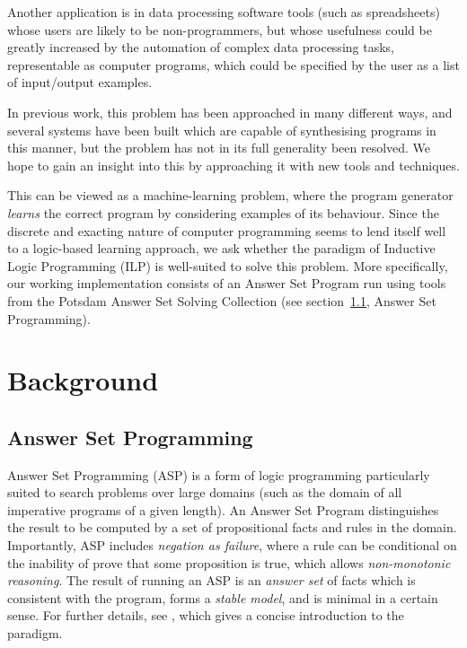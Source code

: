 \documentclass[a4paper,twoside,notitlepage]{article}
\begin{document}
Another application is in data processing software tools (such as spreadsheets) whose 
users are likely to be non-programmers, but whose usefulness could be greatly increased 
by the automation of complex data processing tasks, representable as computer programs, 
which could be specified by the user as a list of input/output examples.

In previous work, this problem has been approached in many different ways, 
and several systems have been built which are capable of synthesising 
programs in this manner, but the problem has not in its full generality 
been resolved. We hope to gain an insight into this by approaching it with 
new tools and techniques.

This can be viewed as a machine-learning problem, where the program generator 
\emph{learns} the correct program by considering examples of its behaviour. Since the 
discrete and exacting nature of computer programming seems to lend itself well to a 
logic-based learning approach, we ask whether the paradigm of Inductive Logic 
Programming (ILP)\cite{muggleton94} is well-suited to solve this problem. More 
specifically, our working implementation consists of an Answer Set Program run using 
tools from the Potsdam Answer Set Solving Collection\cite{potassco} (see 
section~\ref{sec:asp}, Answer Set Programming).

\section{Background}

\subsection{Answer Set Programming} \label{sec:asp}

Answer Set Programming (ASP) is a form of logic programming particularly 
suited to search problems over large domains (such as the domain of all 
imperative programs of a given length). An Answer Set Program 
distinguishes the result to be computed by a set of propositional facts 
and rules in the domain. Importantly, ASP includes \emph{negation as 
failure}, where a rule can be conditional on the inability of prove that 
some proposition is true, which allows \emph{non-monotonic reasoning}. The 
result of running an ASP is an \emph{answer set} of facts which is 
consistent with the program, forms a \emph{stable model}, and is minimal 
in a certain sense. For further details, see \cite{glimpse}, which gives a 
concise introduction to the paradigm.
\end{document}
